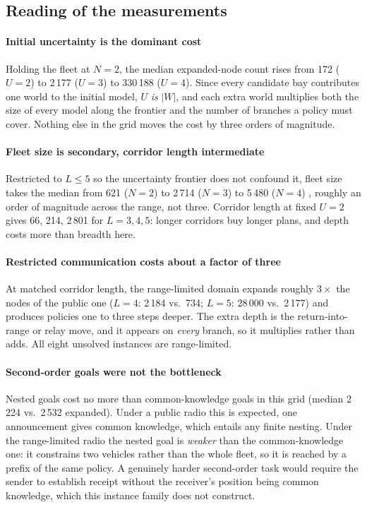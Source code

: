 \subsection{Reading of the measurements}

\paragraph{Initial uncertainty is the dominant cost}
Holding the fleet at $N=2$, the median expanded-node count rises from 172
($U=2$) to 2\,177 ($U=3$) to 330\,188 ($U=4$). Since every candidate bay
contributes one world to the initial model, $U$ \emph{is} $|W|$, and each extra
world multiplies both the size of every model along the frontier and the number
of branches a policy must cover. Nothing else in the grid moves the cost by
three orders of magnitude.

\paragraph{Fleet size is secondary, corridor length intermediate}
Restricted to $L\le5$ so the uncertainty frontier does not confound it, fleet
size takes the median from 621 ($N=2$) to 2\,714 ($N=3$) to 5\,480 ($N=4$) , 
roughly an order of magnitude across the range, not three. Corridor length at
fixed $U=2$ gives 66, 214, 2\,801 for $L=3,4,5$: longer corridors buy longer
plans, and depth costs more than breadth here.

\paragraph{Restricted communication costs about a factor of three}
At matched corridor length, the range-limited domain expands roughly $3\times$
the nodes of the public one ($L=4$: 2\,184 vs.\ 734; $L=5$: 28\,000 vs.\
2\,177) and produces policies one to three steps deeper. The extra depth is the
return-into-range or relay move, and it appears on \emph{every} branch, so it
multiplies rather than adds. All eight unsolved instances are range-limited.

\paragraph{Second-order goals were not the bottleneck}
Nested goals cost no more than common-knowledge goals in this grid (median
2\,224 vs.\ 2\,532 expanded). Under a public radio this is expected, one
announcement gives common knowledge, which entails any finite nesting. Under
the range-limited radio the nested goal is \emph{weaker} than the
common-knowledge one: it constrains two vehicles rather than the whole fleet,
so it is reached by a prefix of the same policy. A genuinely harder
second-order task would require the sender to establish receipt without the
receiver's position being common knowledge, which this instance family does not
construct.


